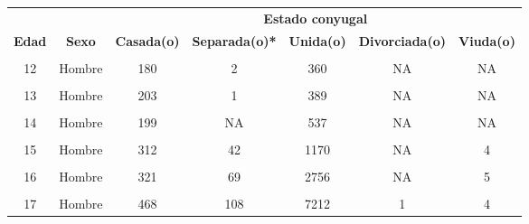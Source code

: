 \begin{tabular}[t]{ccccccc}
\toprule
\multicolumn{1}{c}{\textbf{ }} & \multicolumn{1}{c}{\textbf{ }} & \multicolumn{5}{c}{\textbf{Estado conyugal}} \\
\cmidrule(l{3pt}r{3pt}){3-7}
\textbf{Edad} & \textbf{Sexo} & \textbf{Casada(o)} & \textbf{Separada(o)*} & \textbf{Unida(o)} & \textbf{Divorciada(o)} & \textbf{Viuda(o)}\\
\midrule
\cellcolor[HTML]{B6B3FF}{12} & \cellcolor[HTML]{B6B3FF}{Mujer} & \cellcolor[HTML]{B6B3FF}{114} & \cellcolor[HTML]{B6B3FF}{4} & \cellcolor[HTML]{B6B3FF}{385} & \cellcolor[HTML]{B6B3FF}{NA} & \cellcolor[HTML]{B6B3FF}{NA}\\
12 & Hombre & 180 & 2 & 360 & NA & NA\\
\cellcolor[HTML]{B6B3FF}{13} & \cellcolor[HTML]{B6B3FF}{Mujer} & \cellcolor[HTML]{B6B3FF}{99} & \cellcolor[HTML]{B6B3FF}{13} & \cellcolor[HTML]{B6B3FF}{640} & \cellcolor[HTML]{B6B3FF}{NA} & \cellcolor[HTML]{B6B3FF}{NA}\\
13 & Hombre & 203 & 1 & 389 & NA & NA\\
\cellcolor[HTML]{B6B3FF}{14} & \cellcolor[HTML]{B6B3FF}{Mujer} & \cellcolor[HTML]{B6B3FF}{177} & \cellcolor[HTML]{B6B3FF}{51} & \cellcolor[HTML]{B6B3FF}{2260} & \cellcolor[HTML]{B6B3FF}{NA} & \cellcolor[HTML]{B6B3FF}{NA}\\
14 & Hombre & 199 & NA & 537 & NA & NA\\
\cellcolor[HTML]{B6B3FF}{15} & \cellcolor[HTML]{B6B3FF}{Mujer} & \cellcolor[HTML]{B6B3FF}{367} & \cellcolor[HTML]{B6B3FF}{287} & \cellcolor[HTML]{B6B3FF}{6878} & \cellcolor[HTML]{B6B3FF}{2} & \cellcolor[HTML]{B6B3FF}{5}\\
15 & Hombre & 312 & 42 & 1170 & NA & 4\\
\cellcolor[HTML]{B6B3FF}{16} & \cellcolor[HTML]{B6B3FF}{Mujer} & \cellcolor[HTML]{B6B3FF}{685} & \cellcolor[HTML]{B6B3FF}{522} & \cellcolor[HTML]{B6B3FF}{14356} & \cellcolor[HTML]{B6B3FF}{NA} & \cellcolor[HTML]{B6B3FF}{6}\\
16 & Hombre & 321 & 69 & 2756 & NA & 5\\
\cellcolor[HTML]{B6B3FF}{17} & \cellcolor[HTML]{B6B3FF}{Mujer} & \cellcolor[HTML]{B6B3FF}{1881} & \cellcolor[HTML]{B6B3FF}{1106} & \cellcolor[HTML]{B6B3FF}{27467} & \cellcolor[HTML]{B6B3FF}{1} & \cellcolor[HTML]{B6B3FF}{16}\\
17 & Hombre & 468 & 108 & 7212 & 1 & 4\\
\bottomrule
\end{tabular}
